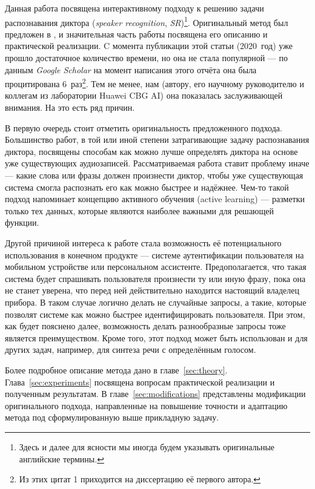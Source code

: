 Данная работа посвящена интерактивному подходу к решению задачи распознавания
диктора (\textit{speaker recognition}, \textit{SR})\footnote{
    Здесь и далее для ясности мы иногда будем указывать оригинальные английские
    термины.
}. Оригинальный метод был предложен в \citeisr, и значительная часть
работы посвящена его описанию и практической реализации. C момента публикации
этой статьи (2020~год) уже прошло достаточное количество времени, но она не
стала популярной --- по данным \textit{Google Scholar} на момент написания
этого отчёта она была процитирована 6~раз\footnote{
    Из этих цитат 1 приходится на диссертацию её первого автора.
}.
Тем не менее, нам (автору, его научному руководителю и коллегам из лаборатории
Huawei CBG AI) она показалась заслуживающей внимания. На это есть ряд причин.

В первую очередь стоит отметить оригинальность предложенного подхода.
Большинство работ, в той или иной степени затрагивающие задачу распознавания
диктора, посвящены способам как можно лучше определять диктора на основе уже
существующих аудиозаписей. Рассматриваемая работа ставит проблему иначе ---
какие слова или фразы должен произнести диктор, чтобы уже существующая система
смогла распознать его как можно быстрее и надёжнее. Чем-то такой подход
напоминает концепцию активного обучения (active learning) --- разметки только
тех данных, которые являются наиболее важными для решающей функции.

Другой причиной интереса к работе стала возможность её потенциального
использования в конечном продукте --- системе аутентификации пользователя на
мобильном устройстве или персональном ассистенте. Предополагается, что такая
система будет спрашивать пользователя произнести ту или иную фразу, пока она не
станет уверена, что перед ней действительно находится настоящий владелец
прибора. В таком случае логично делать не случайные запросы, а такие, которые
позволят системе как можно быстрее идентифицировать пользователя. При этом, как
будет пояснено далее, возможность делать разнообразные запросы тоже является
преимуществом. Кроме того, этот подход может быть использован и для других
задач, например, для синтеза речи с определённым голосом.

Более подробное описание метода дано в главе~\ref{sec:theory}.
Глава~\ref{sec:experiments} посвящена вопросам практической реализации и
полученным результатам. В главе~\ref{sec:modifications} представлены модификации
оригинального подхода, направленные на повышение точности и адаптацию метода под
сформулированную выше прикладную задачу.